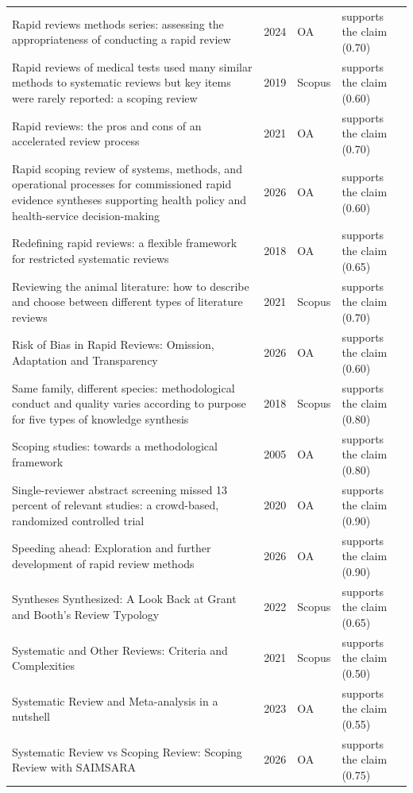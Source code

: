 \begin{longtable}{@{}%
  >{\raggedright\arraybackslash}p{}c%
  >{\raggedright\arraybackslash}p{}%
  >{\raggedright\arraybackslash}p{}@{}}
Rapid reviews methods series: assessing the appropriateness of conducting a rapid review & 2024 & OA & supports the claim (0.70) \\
Rapid reviews of medical tests used many similar methods to systematic reviews but key items were rarely reported: a scoping review & 2019 & Scopus & supports the claim (0.60) \\
Rapid reviews: the pros and cons of an accelerated review process & 2021 & OA & supports the claim (0.70) \\
Rapid scoping review of systems, methods, and operational processes for commissioned rapid evidence syntheses supporting health policy and health-service decision-making & 2026 & OA & supports the claim (0.60) \\
Redefining rapid reviews: a flexible framework for restricted systematic reviews & 2018 & OA & supports the claim (0.65) \\
Reviewing the animal literature: how to describe and choose between different types of literature reviews & 2021 & Scopus & supports the claim (0.70) \\
Risk of Bias in Rapid Reviews: Omission, Adaptation and Transparency & 2026 & OA & supports the claim (0.60) \\
Same family, different species: methodological conduct and quality varies according to purpose for five types of knowledge synthesis & 2018 & Scopus & supports the claim (0.80) \\
Scoping studies: towards a methodological framework & 2005 & OA & supports the claim (0.80) \\
Single-reviewer abstract screening missed 13 percent of relevant studies: a crowd-based, randomized controlled trial & 2020 & OA & supports the claim (0.90) \\
Speeding ahead: Exploration and further development of rapid review methods & 2026 & OA & supports the claim (0.90) \\
Syntheses Synthesized: A Look Back at Grant and Booth's Review Typology & 2022 & Scopus & supports the claim (0.65) \\
Systematic and Other Reviews: Criteria and Complexities & 2021 & Scopus & supports the claim (0.50) \\
Systematic Review and Meta-analysis in a nutshell & 2023 & OA & supports the claim (0.55) \\
Systematic Review vs Scoping Review: Scoping Review with SAIMSARA & 2026 & OA & supports the claim (0.75) \\

\end{longtable}
